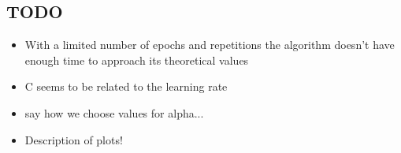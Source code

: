 \subsection{TODO}
\begin{itemize}
    \item With a limited number of epochs and repetitions the algorithm doesn't have enough time to approach its theoretical values
    \item C seems to be related to the learning rate
    \item say how we choose values for alpha...
    \item Description of plots!
\end{itemize}
